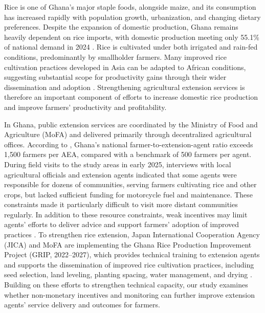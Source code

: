 \documentclass[11pt]{article}
\begin{document}
Rice is one of Ghana's major staple foods, alongside maize, and its consumption has increased rapidly with population growth, urbanization, and changing dietary preferences. Despite the expansion of domestic production, Ghana remains heavily dependent on rice imports, with domestic production meeting only 55.1\% of national demand in 2024 \citep{ndpc_progress_2025}. Rice is cultivated under both irrigated and rain-fed conditions, predominantly by smallholder farmers. Many improved rice cultivation practices developed in Asia can be adapted to African conditions, suggesting substantial scope for productivity gains through their wider dissemination and adoption \citep{Otsuka2024}. Strengthening agricultural extension services is therefore an important component of efforts to increase domestic rice production and improve farmers' productivity and profitability. 

In Ghana, public extension services are coordinated by the Ministry of Food and Agriculture (MoFA) and delivered primarily through decentralized agricultural offices. According to \citet{MoFA2025Extension}, Ghana's national farmer-to-extension-agent ratio exceeds 1,500 farmers  per AEA, compared with a benchmark of 500 farmers per agent. During field visits to the study areas in early 2025, interviews with local agricultural officials and extension agents indicated that some agents were responsible for dozens of communities, serving farmers cultivating rice and other crops, but lacked sufficient funding for motorcycle fuel and maintenance. These constraints made it particularly difficult to visit more distant communities regularly. In addition to these resource constraints, weak incentives may limit agents' efforts to deliver advice and support farmers' adoption of improved practices \citep{Ragasa2013, Takahashi2020}. To strengthen rice extension, Japan International Cooperation Agency (JICA) and MoFA are implementing the Ghana Rice Production Improvement Project (GRIP, 2022--2027), which provides technical training to extension agents and supports the dissemination of improved rice cultivation practices, including seed selection, land leveling, planting spacing, water management, and drying \citep{jica_grip_2022}. Building on these efforts to strengthen technical capacity, our study examines whether non-monetary incentives and monitoring can further improve extension agents' service delivery and outcomes for farmers.



\end{document}
